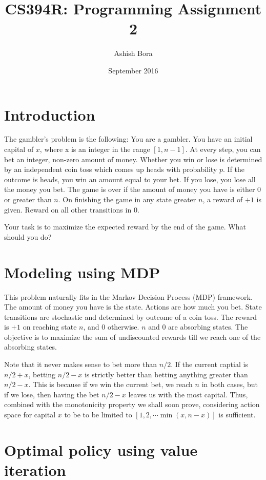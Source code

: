 \documentclass{article}
\title{CS394R: Programming Assignment 2}
\author{Ashish Bora}
\date{September 2016}
\begin{document}
\maketitle

\section{Introduction}

The gambler's problem is the following: You are a gambler. You have an initial capital of $x$, where x is an integer in the range $[1, n-1]$. At every step, you can bet an integer, non-zero amount of money. Whether you win or lose is determined by an independent coin toss which comes up heads with probability $p$. If the outcome is heads, you win an amount equal to your bet. If you lose, you lose all the money you bet. The game is over if the amount of money you have is either $0$ or greater than $n$. On finishing the game in any state greater $n$, a reward of $+1$  is given. Reward on all other transitions in $0$.

Your task is to maximize the expected reward by the end of the game. What should you do?

\section{Modeling using MDP}

This problem naturally fits in the Markov Decision Process (MDP) framework. The amount of money you have is the state. Actions are how much you bet. State transitions are stochastic and determined by outcome of a coin toss. The reward is $+1$ on reaching state $n$, and $0$ otherwise. $n$ and $0$ are absorbing states. The objective is to maximize the sum of undiscounted rewards till we reach one of the absorbing states.

Note that it never makes sense to bet more than $n/2$. If the current captial is $n/2 + x$, betting $n/2 - x$ is strictly better than betting anything greater than $n/2 - x$. This is because if we win the current bet, we reach $n$ in both cases, but if we lose, then having the bet $n/2-x$ leaves us with the most capital. Thus, combined with the monotonicity property we shall soon prove, considering action space for capital $x$ to be to be limited to $\left[1, 2, \cdots \min \left(x, n - x\right)\right]$ is sufficient.

\section{Optimal policy using value iteration}
\end{document}
